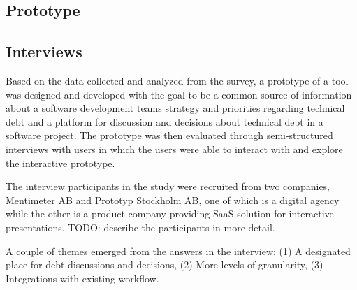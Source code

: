 \subsection{Prototype}







\subsection{Interviews}
Based on the data collected and analyzed from the survey, a prototype of a tool was designed and developed with the goal to be a common source of information about a software development teams strategy and priorities regarding technical debt and a platform for discussion and decisions about technical debt in a software project.
The prototype was then evaluated through semi-structured interviews with users in which the users were able to interact with and explore the interactive prototype.

The interview participants in the study were recruited from two companies, Mentimeter AB and Prototyp Stockholm AB, one of which is a digital agency while the other is a product company providing SaaS solution for interactive presentations. TODO: describe the participants in more detail.

A couple of themes emerged from the answers in the interview: (1) A designated place for debt discussions and decisions, (2) More levels of granularity, (3) Integrations with existing workflow.